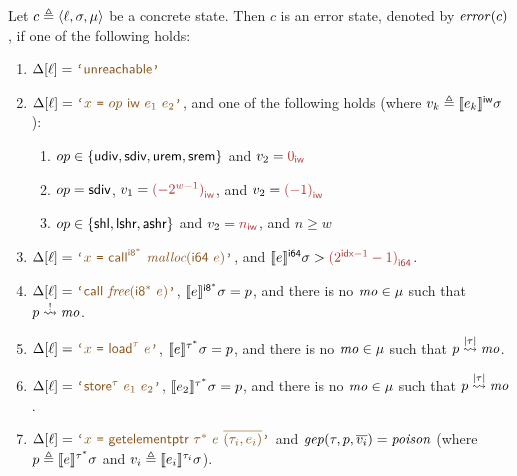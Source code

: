 \begin{definition}
\label{def:error-state}
Let $c \triangleq \langle{\ell},{\sigma},{\mathit{\mu}}\rangle$ be a concrete state.
Then $c$ is an error state, denoted by $\mathit{error}(c)$, if one of the following holds:
\begin{enumerate}
    \item $\instrat{\location} = \textup{$\codequote{\tunreachable}$}$
    \item $\instrat{\location} = \textup{$\codequote{x \ \texttt{=} \ op \ \bvsort{w} \ e_1 \ e_2}$}$, and one of the following holds (where $v_k \triangleq \llbracket e_k \rrbracket^{\textsf{iw}}{\sigma}$):
    \begin{enumerate}[left=-3pt]
        \item \textup{$op \in \{\textsf{udiv}, \textsf{sdiv}, \textsf{urem}, \textsf{srem}\}$ and $v_2 = \bvval{0}{w}$}
        \item \textup{$op = \textsf{sdiv}$, $v_1 = \bvval{(-2^{w - 1})}{w}$, and $v_2 = \bvval{(-1)}{w}$}
        \item \textup{$op \in \{\textsf{shl}, \textsf{lshr}, \textsf{ashr}\}$ and $v_2 = \bvval{n}{w}$, and $n \geq w$}
    \end{enumerate}
    \item $\instrat{\location} = \textup{$\codequote{x \ \texttt{=} \ \tcall^{\pointertypeof{\bvsort{8}}} \ \intrinsicfunc{malloc}(\bvsort{64} \ e)}$}$,
          and \textup{$\evalexprty{e}{\localstore}{\bvsort{64}} > \bvval{(2^{\indexwidth - 1} - 1)}{64}$}.
    \item $\instrat{\location} = \textup{$\codequote{\tcall~\intrinsicfunc{free}(\pointertypeof{\bvsort{8}} \ e)}$}$, \textup{$\llbracket e \rrbracket^{\mathit{\textsf{i8}^{*}}}{\sigma} = p$},
          and there is no $\mathit{mo} \in \mathit{\mu}$ such that $\isbaseaddr{p}{\mo}$.
    \item $\instrat{\location} = \textup{$\codequote{x \ \texttt{=} \ \tload^{\tau} \ e}$}$, \textup{$\llbracket e \rrbracket^{\mathit{\tau^{*}}}{\sigma} = p$},
          and there is no $\mathit{mo} \in \mathit{\mu}$ such that $p \overset{|\tau|}{\rightsquigarrow} \mathit{mo}$.
    \item $\instrat{\location} = \textup{$\codequote{\tstore^{\tau} \ e_1 \ e_2}$}$, \textup{$\llbracket e_2 \rrbracket^{\mathit{\tau^{*}}}{\sigma} = p$},
          and there is no $\mathit{mo} \in \mathit{\mu}$ such that $p \overset{|\tau|}{\rightsquigarrow} \mathit{mo}$.
    \item $\instrat{\location} = \textup{$\codequote{x \ \texttt{=} \ \tgep~\pointertypeof{\tau} \ e \ \overline{(\tau_i, e_i)}}$}$ and $\mathit{gep}(\tau, p, \overline{v_i}) = \mathit{poison}$
          (where \textup{$p \triangleq \llbracket e \rrbracket^{\mathit{\tau^{*}}}{\sigma}$} and $v_i \triangleq \llbracket e_i \rrbracket^{\tau_i}{\sigma}$).
\end{enumerate}
\end{definition}

